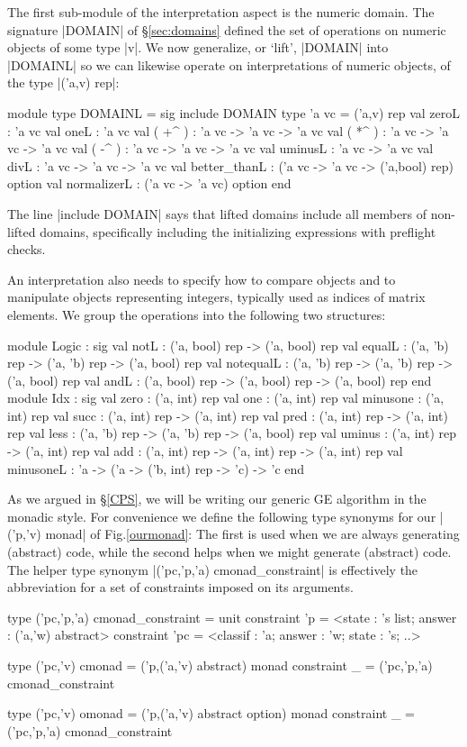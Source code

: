 \documentclass{elsart}
\begin{document}
The first sub-module of the interpretation aspect is the numeric
domain. The signature |DOMAIN| of \S\ref{sec:domains} defined the set
of operations on numeric objects of some type |v|. We now
generalize, or `lift', |DOMAIN| into |DOMAINL| so we can likewise
operate on interpretations of numeric objects, of the type
|('a,v) rep|:
\begin{code}
module type DOMAINL = sig
  include DOMAIN
  type 'a vc = ('a,v) rep
  val zeroL : 'a vc
  val oneL  : 'a vc
  val ( +^ ) : 'a vc -> 'a vc -> 'a vc
  val ( *^ ) : 'a vc -> 'a vc -> 'a vc
  val ( -^ ) : 'a vc -> 'a vc -> 'a vc
  val uminusL : 'a vc -> 'a vc
  val divL    : 'a vc -> 'a vc -> 'a vc
  val better_thanL : ('a vc -> 'a vc -> ('a,bool) rep) option
  val normalizerL  : ('a vc -> 'a vc) option
end 
\end{code}
The line |include DOMAIN| says that lifted domains include all members
of non-lifted domains, specifically including the initializing
expressions with preflight checks.

An interpretation also needs to specify how to compare objects
and to manipulate objects representing integers, typically used as
indices of matrix elements. We group the operations into the
following two structures:
\begin{code}
module Logic : sig
  val notL      : ('a, bool) rep -> ('a, bool) rep
  val equalL    : ('a, 'b) rep   -> ('a, 'b) rep   -> ('a, bool) rep
  val notequalL : ('a, 'b) rep   -> ('a, 'b) rep   -> ('a, bool) rep
  val andL      : ('a, bool) rep -> ('a, bool) rep -> ('a, bool) rep
end
module Idx : sig
  val zero : ('a, int) rep
  val one  : ('a, int) rep
  val minusone : ('a, int) rep
  val succ : ('a, int) rep -> ('a, int) rep
  val pred : ('a, int) rep -> ('a, int) rep
  val less : ('a, 'b) rep  -> ('a, 'b) rep -> ('a, bool) rep
  val uminus : ('a, int) rep -> ('a, int) rep
  val add : ('a, int) rep   -> ('a, int) rep -> ('a, int) rep
  val minusoneL : 'a -> ('a -> ('b, int) rep -> 'c) -> 'c
end
\end{code}

As we argued in \S\ref{CPS}, we will be writing our generic GE
algorithm in the monadic style. For convenience we define the
following type synonyms for our |('p,'v) monad| of Fig.\ref{ourmonad}:
The first is used when we are always generating (abstract) code, while
the second helps when we might generate (abstract) code. The helper
type synonym |('pc,'p,'a) cmonad_constraint| is effectively the
abbreviation for a set of constraints imposed on its arguments.
\begin{code}
type ('pc,'p,'a) cmonad_constraint = unit
      constraint
	  'p = <state : 's list; answer : ('a,'w) abstract>
      constraint
          'pc = <classif : 'a; answer : 'w; state : 's; ..>

type ('pc,'v) cmonad = ('p,('a,'v) abstract) monad
      constraint _ = ('pc,'p,'a) cmonad_constraint 

type ('pc,'v) omonad = ('p,('a,'v) abstract option) monad
      constraint _ = ('pc,'p,'a) cmonad_constraint 
\end{code}
\end{document}
